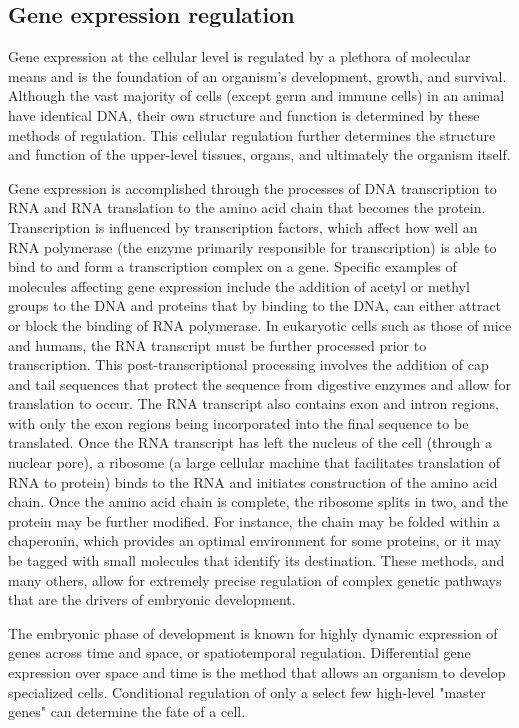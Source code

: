 \documentclass[12pt,oneside,onecolumn,a4paper]{article}
\begin{document}
\subsection{Gene expression regulation}
Gene expression at the cellular level is regulated by a plethora of molecular means and is the foundation of an organism's development, growth, and survival. Although the vast majority of cells (except germ and immune cells) in an animal have identical DNA, their own structure and function is determined by these methods of regulation. This cellular regulation further determines the structure and function of the upper-level tissues, organs, and ultimately the organism itself. 

Gene expression is accomplished through the processes of DNA transcription to RNA and RNA translation to the amino acid chain that becomes the protein. Transcription is influenced by transcription factors, which affect how well an RNA polymerase (the enzyme primarily responsible for transcription) is able to bind to and form a transcription complex on a gene. Specific examples of molecules affecting gene expression include the addition of acetyl or methyl groups to the DNA and proteins that by binding to the DNA, can either attract or block the binding of RNA polymerase. In eukaryotic cells such as those of mice and humans, the RNA transcript must be further processed prior to transcription. This post-transcriptional processing involves the addition of cap and tail sequences that protect the sequence from digestive enzymes and allow for translation to occur. The RNA transcript also contains exon and intron regions, with only the exon regions being incorporated into the final sequence to be translated. Once the RNA transcript has left the nucleus of the cell (through a nuclear pore), a ribosome (a large cellular machine that facilitates translation of RNA to protein) binds to the RNA and initiates construction of the amino acid chain. Once the amino acid chain is complete, the ribosome splits in two, and the protein may be further modified. For instance, the chain may be folded within a chaperonin, which provides an optimal environment for some proteins, or it may be tagged with small molecules that identify its destination. These methods, and many others, allow for extremely precise regulation of complex genetic pathways that are the drivers of embryonic development.

The embryonic phase of development is known for highly dynamic expression of genes across time and space, or spatiotemporal regulation. Differential gene expression over space and time is the method that allows an organism to develop specialized cells. Conditional regulation of only a  select few high-level "master genes" can determine the fate of a cell. 
\citep{bisceglia_2010}
\end{document}
